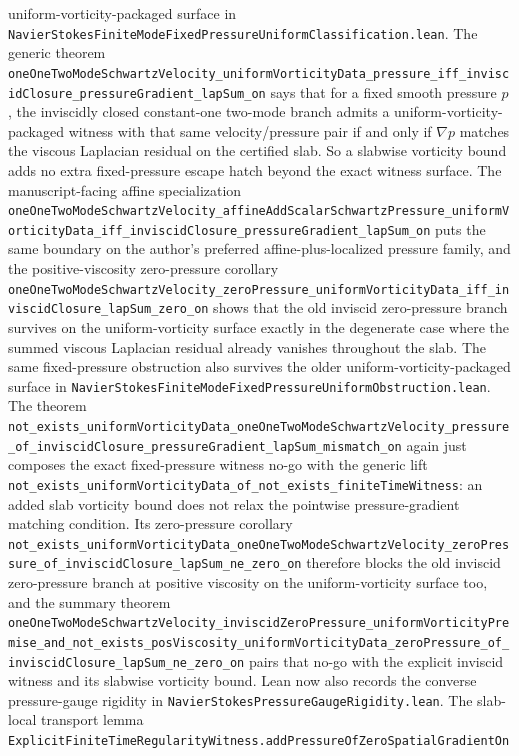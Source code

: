 \documentclass[11pt]{article}
\theoremstyle{remark}
\begin{document}
uniform-vorticity-packaged surface in
\texttt{NavierStokesFiniteModeFixedPressureUniformClassification.lean}.  The
generic theorem
\texttt{oneOneTwoModeSchwartzVelocity\_uniformVorticityData\_pressure\_iff\_inviscidClosure\_pressureGradient\_lapSum\_on}
says that for a fixed smooth pressure \(p\), the inviscidly closed constant-one
two-mode branch admits a uniform-vorticity-packaged witness with that same
velocity/pressure pair if and only if \(\nabla p\) matches the viscous
Laplacian residual on the certified slab.  So a slabwise vorticity bound adds
no extra fixed-pressure escape hatch beyond the exact witness surface.  The
manuscript-facing affine specialization
\texttt{oneOneTwoModeSchwartzVelocity\_affineAddScalarSchwartzPressure\_uniformVorticityData\_iff\_inviscidClosure\_pressureGradient\_lapSum\_on}
puts the same boundary on the author's preferred affine-plus-localized pressure
family, and the positive-viscosity zero-pressure corollary
\texttt{oneOneTwoModeSchwartzVelocity\_zeroPressure\_uniformVorticityData\_iff\_inviscidClosure\_lapSum\_zero\_on}
shows that the old inviscid zero-pressure branch survives on the
uniform-vorticity surface exactly in the degenerate case where the summed
viscous Laplacian residual already vanishes throughout the slab.
The same fixed-pressure obstruction also survives the older
uniform-vorticity-packaged surface in
\texttt{NavierStokesFiniteModeFixedPressureUniformObstruction.lean}.  The
theorem
\texttt{not\_exists\_uniformVorticityData\_oneOneTwoModeSchwartzVelocity\_pressure\_of\_inviscidClosure\_pressureGradient\_lapSum\_mismatch\_on}
again just composes the exact fixed-pressure witness no-go with the generic
lift
\texttt{not\_exists\_uniformVorticityData\_of\_not\_exists\_finiteTimeWitness}:
an added slab vorticity bound does not relax the pointwise pressure-gradient
matching condition.  Its zero-pressure corollary
\texttt{not\_exists\_uniformVorticityData\_oneOneTwoModeSchwartzVelocity\_zeroPressure\_of\_inviscidClosure\_lapSum\_ne\_zero\_on}
therefore blocks the old inviscid zero-pressure branch at positive viscosity
on the uniform-vorticity surface too, and the summary theorem
\texttt{oneOneTwoModeSchwartzVelocity\_inviscidZeroPressure\_uniformVorticityPremise\_and\_not\_exists\_posViscosity\_uniformVorticityData\_zeroPressure\_of\_inviscidClosure\_lapSum\_ne\_zero\_on}
pairs that no-go with the explicit inviscid witness and its slabwise
vorticity bound.
Lean now also records the converse pressure-gauge rigidity in
\texttt{NavierStokesPressureGaugeRigidity.lean}.  The slab-local transport
lemma
\texttt{ExplicitFiniteTimeRegularityWitness.addPressureOfZeroSpatialGradientOn}
\end{document}
